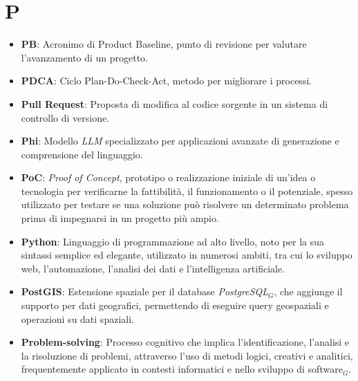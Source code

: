 \section{P}
\begin{itemize}
    \item \textbf{PB}: Acronimo di Product Baseline, punto di revisione per valutare l'avanzamento di un progetto.
    \item \textbf{PDCA}: Ciclo Plan-Do-Check-Act, metodo per migliorare i processi.
    \item \textbf{Pull Request}: Proposta di modifica al codice sorgente in un sistema di controllo di versione.
    \item \textbf{Phi}: Modello \textit{LLM} specializzato per applicazioni avanzate di generazione e comprensione del linguaggio.
    \item \textbf{PoC}: \textit{Proof of Concept}, prototipo o realizzazione iniziale di un'idea o tecnologia per verificarne la fattibilità, il funzionamento o il potenziale, spesso utilizzato per testare se una soluzione può risolvere un determinato problema prima di impegnarsi in un progetto più ampio.
    \item \textbf{Python}: Linguaggio di programmazione ad alto livello, noto per la sua sintassi semplice ed elegante, utilizzato in numerosi ambiti, tra cui lo sviluppo web, l'automazione, l'analisi dei dati e l'intelligenza artificiale.
    \item \textbf{PostGIS}: Estensione spaziale per il database \textit{PostgreSQL$_G$}, che aggiunge il supporto per dati geografici, permettendo di eseguire query geospaziali e operazioni su dati spaziali.
    \item \textbf{Problem-solving}: Processo cognitivo che implica l'identificazione, l'analisi e la risoluzione di problemi, attraverso l'uso di metodi logici, creativi e analitici, frequentemente applicato in contesti informatici e nello sviluppo di software$_G$.

\end{itemize}
